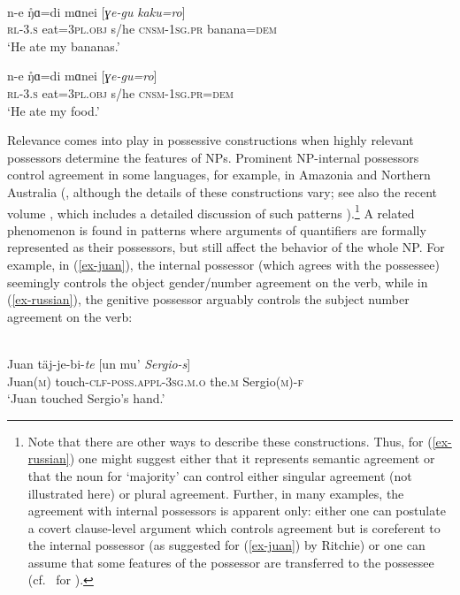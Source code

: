 \documentclass[output=paper,nobabel,draftmode  ,colorlinks, citecolor=brown]{langscibook}
\begin{document}
\ea
{}\\
\ea 
\gll n-e	     \r{ŋ​}ɑ​=di              mɑ​nei [\emph{ɣ​e-gu}	                     \emph{kaku=ro}] \\ 
     \textsc{rl}-\textsc{3.s} eat=\textsc{3pl.obj} s/he  \spacebr{}\textsc{cnsm-1sg.pr} banana=\textsc{dem} \\
\glt `He ate my bananas.'

\ex 
\gll n-e	      \r{ŋ​}ɑ​=di              mɑ​nei [\emph{ɣ​e-gu=ro}] \\ 
     \textsc{rl}-\textsc{3.s} eat=\textsc{3pl.obj} s/he  \spacebr{}\textsc{cnsm-1sg.pr=dem} \\
\glt `He ate my food.'
\z
\z

\largerpage
\noindent
Relevance comes into play in possessive constructions when highly relevant possessors determine the features of NPs. Prominent NP-internal possessors control agreement in some languages, for example, in Amazonia \parencites[cf.][]{Dixon2000, Ritchie2017} and Northern Australia (\cite{MeakinsNordlinger2017}, although the details of these constructions vary; see also the recent volume \citep{BaranyNikolaeva2019}, which includes a detailed discussion of such patterns \citep{Nikolevaetal2019}).\footnote{Note that there are other ways to describe these constructions. Thus, for (\ref{ex-russian}) one might suggest either that it represents semantic agreement or that the noun for `majority' can control either singular agreement (not illustrated here) or plural agreement. Further, in many examples, the agreement with internal possessors is apparent only: either one can postulate a covert clause-level argument which controls agreement but is coreferent to the internal possessor (as suggested for (\ref{ex-juan}) by Ritchie) or one can assume that some features of the possessor are transferred to the possessee (cf.\ \cite{Lander2011} for ).}   
A related phenomenon is found in patterns where arguments of quantifiers are formally represented as their possessors, but still affect the behavior of the whole NP. For example, in (\ref{ex-juan}), the internal possessor (which agrees with the possessee) seemingly controls the object gender/number agreement on the verb, while in (\ref{ex-russian}), the genitive possessor arguably controls the subject number agreement on the verb:


\ea\label{ex-juan} 
\\
\gll Juan	täj-je-bi-\emph{te} [un mu' \emph{Sergio-s}] \\ {Juan(\textsc{m})}	touch-\textsc{clf-poss.appl-3sg.m.o}   the.\textsc{m}  Sergio\textsc{(m)-f} \\
\glt `Juan touched Sergio's hand.'
\z
\end{document}
